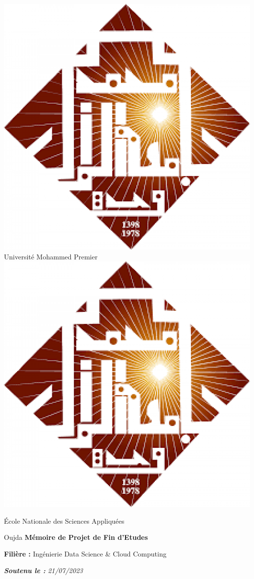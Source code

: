 \documentclass[a4paper,12 pt,twoside]{report}
\begin{document}
\begin{titlepage}

 \selectfont

\begin {center}


        \includegraphics[scale=0.1]{logos/ump}\hfill
        \LARGE Université Mohammed Premier\hfill
        \includegraphics[scale=0.1]{logos/ump}\par
        \Large École Nationale des Sciences Appliquées\par
        \Large Oujda\vfill
        \Large\textbf{Mémoire de Projet de Fin d'Etudes}\par
        \large \textbf{Filière :} Ingénierie Data Science \& Cloud Computing\par
        \textit {\textbf {Soutenu le :} 21/07/2023}\par


\end{center}
\end{titlepage}
\end{document}
